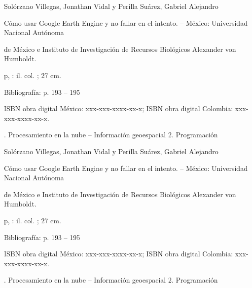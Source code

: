\newpage

\vspace*{\fill}
\begin{center}
    \begin{blackbox}
        
            {\footnotesize Solórzano Villegas, Jonathan Vidal y Perilla Suárez, Gabriel Alejandro

            \quad Cómo usar Google Earth Engine y no fallar en el intento. – México: Universidad Nacional Autónoma 
            
            \quad de México e Instituto de Investigación de Recursos Biológicos Alexander von Humboldt.

             p, : il. col. ; 27 cm.

            \quad Bibliografía: p. 193 – 195

            \quad ISBN obra digital México: xxx-xxx-xxxx-xx-x; ISBN obra digital Colombia: xxx-xxx-xxxx-xx-x.

            . Procesamiento en la nube – Información geoespacial 2. Programación}
        
    \end{blackbox}
    \begin{blackbox}
        \begingroup
            \fontsize{10}{12}\selectfont
            Solórzano Villegas, Jonathan Vidal y Perilla Suárez, Gabriel Alejandro

            \quad Cómo usar Google Earth Engine y no fallar en el intento. – México: Universidad Nacional Autónoma 
            
            \quad de México e Instituto de Investigación de Recursos Biológicos Alexander von Humboldt.

             p, : il. col. ; 27 cm.

            \quad Bibliografía: p. 193 – 195

            \quad ISBN obra digital México: xxx-xxx-xxxx-xx-x; ISBN obra digital Colombia: xxx-xxx-xxxx-xx-x.

            . Procesamiento en la nube – Información geoespacial 2. Programación
        \endgroup
    \end{blackbox}
\end{center}

